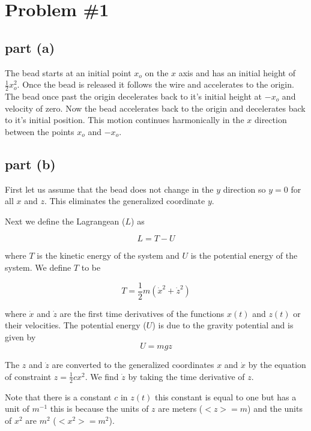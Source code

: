 \documentclass[11pt]{article}
\numberwithin{equation}{section}
\begin{document}


\section{Problem \#1}
\subsection{part (a)}
The bead starts at an initial point $x_o$ on the $x$ axis and has an 
initial height of $\frac{1}{2}x_o^2$. Once the bead is released it follows the 
wire and accelerates to the origin. The bead once past the origin decelerates 
back to it's initial height at $-x_o$ and velocity of zero. Now the bead 
accelerates back to the origin and decelerates back to it's initial position. This motion continues harmonically in the $x$ direction between the points $x_o$ and $-x_o$.

\subsection{part (b)}
First let us assume that the bead does not change in the $y$ direction so 
$y = 0$ for all $x$ and $z$. This eliminates the generalized coordinate $y$.

Next we define the Lagrangean ($L$) as
\begin{center}
\begin{equation}
L = T - U
\label{Lagrangean}
\end{equation}
\end{center}
where $T$ is the kinetic energy of the system and $U$ is the potential energy of the system. We define $T$ to be
\begin{center} 
\begin{equation}
T = \frac{1}{2} m (\dot{x}^2 + \dot{z}^2)
\label{Kin_en}
\end{equation}
\end{center}
where $\dot{x}$ and $\dot{z}$ are the first time derivatives of the functions $x(t)$ and $z(t)$ or their velocities. The potential energy ($U$) is due to the
gravity potential and is given by
\begin{equation}
U = mgz
\label{Pot}
\end{equation}

The $z$ and $\dot{z}$ are converted to the generalized coordinates $x$ and $\dot{x}$ by the equation of constraint $z = \frac{1}{2} c x^2$. We find $\dot{z}$ by taking the time derivative of $z$. 

Note that there is a constant $c$ in $z(t)$ this constant is equal to one but has a unit of $m^{-1}$ this is because the units of $z$ are meters ($<z> = m$) and the units of $x^2$ are $m^2$ ($<x^2> = m^2$).
\end{document}
